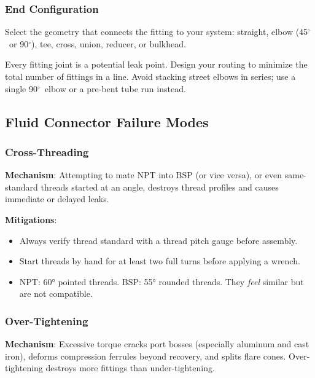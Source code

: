 \subsubsection{End Configuration}

Select the geometry that connects the fitting to your system: straight, elbow (45$^{\circ}$\ or 90$^{\circ}$), tee, cross, union, reducer, or bulkhead. 

\begin{tipbox}
Every fitting joint is a potential leak point. Design your routing to minimize the total number of fittings in a line. Avoid stacking street elbows in series; use a single 90$^{\circ}$\ elbow or a pre-bent tube run instead.
\end{tipbox}


\subsection{Fluid Connector Failure Modes}
\label{sec:fluidfailure}

\subsubsection{Cross-Threading}

\textbf{Mechanism}: Attempting to mate NPT into BSP (or vice versa), or even same-standard threads started at an angle, destroys thread profiles and causes immediate or delayed leaks.

\textbf{Mitigations}:
\begin{itemize}[nosep,leftmargin=1.5em]
  \item Always verify thread standard with a thread pitch gauge before assembly.
  \item Start threads by hand for at least two full turns before applying a wrench.
  \item NPT: \ang{60} pointed threads. BSP: \ang{55} rounded threads. They \emph{feel} similar but are not compatible.
\end{itemize}

\subsubsection{Over-Tightening}

\textbf{Mechanism}: Excessive torque cracks port bosses (especially aluminum and cast iron), deforms compression ferrules beyond recovery, and splits flare cones. Over-tightening destroys more fittings than under-tightening.

